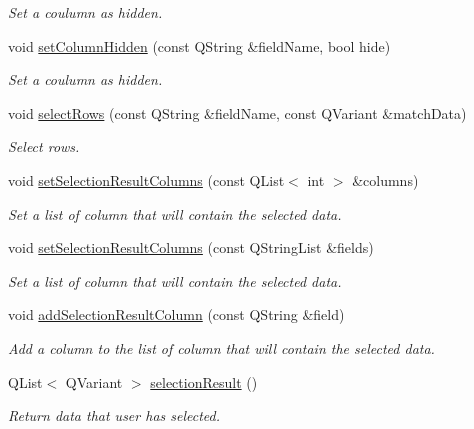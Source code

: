 \begin{DoxyCompactItemize}
\begin{DoxyCompactList}\small\item\em Set a coulumn as hidden. \end{DoxyCompactList}\item 
void \hyperlink{classmdt_sql_selection_dialog_a163280676920829583a4888b742fc96c}{setColumnHidden} (const QString \&fieldName, bool hide)
\begin{DoxyCompactList}\small\item\em Set a coulumn as hidden. \end{DoxyCompactList}\item 
void \hyperlink{classmdt_sql_selection_dialog_ad28449f5ab1b3ad4fdbdf3f5a0fbb456}{selectRows} (const QString \&fieldName, const QVariant \&matchData)
\begin{DoxyCompactList}\small\item\em Select rows. \end{DoxyCompactList}\item 
void \hyperlink{classmdt_sql_selection_dialog_a88311778de191bf78e351ea4370b9a6d}{setSelectionResultColumns} (const QList$<$ int $>$ \&columns)
\begin{DoxyCompactList}\small\item\em Set a list of column that will contain the selected data. \end{DoxyCompactList}\item 
void \hyperlink{classmdt_sql_selection_dialog_a5c5c36414bf3c432979f53ad27f985cb}{setSelectionResultColumns} (const QStringList \&fields)
\begin{DoxyCompactList}\small\item\em Set a list of column that will contain the selected data. \end{DoxyCompactList}\item 
void \hyperlink{classmdt_sql_selection_dialog_ae5582bd717078a137dd71d5a1b9cc9f9}{addSelectionResultColumn} (const QString \&field)
\begin{DoxyCompactList}\small\item\em Add a column to the list of column that will contain the selected data. \end{DoxyCompactList}\item 
QList$<$ QVariant $>$ \hyperlink{classmdt_sql_selection_dialog_a23592c799f3b8945b3f5e72082dc265b}{selectionResult} ()
\begin{DoxyCompactList}\small\item\em Return data that user has selected. \end{DoxyCompactList}\item 

\end{DoxyCompactItemize}
